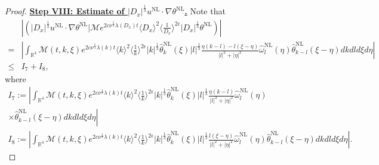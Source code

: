 \documentclass[reqno, 12pt]{amsart} %
\theoremstyle{plain} %
\theoremstyle{definition}
\theoremstyle{remark}
\numberwithin{equation}{section} %
\newcommand{\lt}{\left}
\newcommand{\rt}{\right}
\begin{document}
\begin{proof}
		\underline{\bf Step VIII: Estimate of $ |D_x|^\frac13  u^{\mathrm{NL}} \cdot  \nabla  \theta^{\mathrm{NL}}$.} Note that
		$$
		\begin{aligned}
			& \left|\left( |D_x|^\frac13 u^{\mathrm{NL}} \cdot \nabla \theta^{\mathrm{NL}} \big| \mathcal{M} e^{2 c \nu^{\frac{1}{3}} \lambda\left(D_x\right) t}\langle D_x\rangle^2\langle\frac{1}{D_x}\rangle^{2 \epsilon} |D_x|^\frac13 \theta^{\mathrm{NL}}\right)\right| \\
			= & \left|\int_{\mathbb{R}^4} \mathcal{M}(t, k, \xi) e^{2 c \nu^{\frac{1}{3}} \lambda(k) t}\langle k\rangle^2\langle\frac{1}{k}\rangle^{2 \epsilon} |k|^\frac13\hat{\theta}_k^{\mathrm{NL}}(\xi) |l|^\frac13  \frac{\eta(k-l)-l(\xi-\eta)}{|l|^2+|\eta|^2} \hat{\omega}_l^{\mathrm{NL}}(\eta) \hat{\theta}_{k-l}^{\mathrm{NL}}(\xi-\eta) d k d l d \xi d \eta\right| \\
			\leq & I_7 + I_8,
		\end{aligned}
		$$
		where
		$$
		\begin{gathered}
			I_7:=\left| \int_{\mathbb{R}^4} \mathcal{M}(t, k, \xi) e^{2 c \nu^{\frac{1}{3}} \lambda(k) t}\langle k\rangle^2\langle\frac{1}{k}\rangle^{2 \epsilon} |k|^\frac13\hat{\theta}_k^{\mathrm{NL}}(\xi) |l|^\frac13  \frac{\eta(k-l) }{|l|^2+|\eta|^2} \hat{\omega}_l^{\mathrm{NL}}(\eta)\right. \\ \lt.
			\times \hat{\theta}_{k-l}^{\mathrm{NL}}(\xi-\eta) d k d l d \xi d \eta \rt| \\
			I_8:=\left|\int_{\mathbb{R}^4} \mathcal{M}(t, k, \xi) e^{2 c \nu^{\frac{1}{3}} \lambda(k) t}\langle k\rangle^2\langle\frac{1}{k}\rangle^{2 \epsilon} |k|^\frac13\hat{\theta}_k^{\mathrm{NL}}(\xi) |l|^\frac13  \frac{ l(\xi - \eta )}{|l|^2+|\eta|^2} \hat{\omega}_l^{\mathrm{NL}}(\eta) \hat{\theta}_{k-l}^{\mathrm{NL}}(\xi-\eta) d k d l d \xi d \eta\right| .
		\end{gathered}
		$$  
		

\end{proof}
\end{document}
